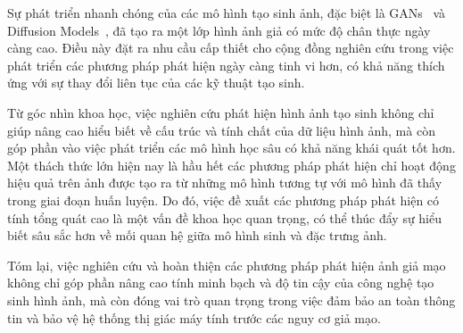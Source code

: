 Sự phát triển nhanh chóng của các mô hình tạo sinh ảnh, đặc biệt là GANs~\cite{Goodfellow2014GenerativeAN} và Diffusion Models~\cite{Ho2020DenoisingDP}, đã tạo ra một lớp hình ảnh giả có mức độ chân thực ngày càng cao. Điều này đặt ra nhu cầu cấp thiết cho cộng đồng nghiên cứu trong việc phát triển các phương pháp phát hiện ngày càng tinh vi hơn, có khả năng thích ứng với sự thay đổi liên tục của các kỹ thuật tạo sinh.
%

Từ góc nhìn khoa học, việc nghiên cứu phát hiện hình ảnh tạo sinh không chỉ giúp nâng cao hiểu biết về cấu trúc và tính chất của dữ liệu hình ảnh, mà còn góp phần vào việc phát triển các mô hình học sâu có khả năng khái quát tốt hơn. Một thách thức lớn hiện nay là hầu hết các phương pháp phát hiện chỉ hoạt động hiệu quả trên ảnh được tạo ra từ những mô hình tương tự với mô hình đã thấy trong giai đoạn huấn luyện. Do đó, việc đề xuất các phương pháp phát hiện có tính tổng quát cao là một vấn đề khoa học quan trọng, có thể thúc đẩy sự hiểu biết sâu sắc hơn về mối quan hệ giữa mô hình sinh và đặc trưng ảnh.
%


Tóm lại, việc nghiên cứu và hoàn thiện các phương pháp phát hiện ảnh giả mạo không chỉ góp phần nâng cao tính minh bạch và độ tin cậy của công nghệ tạo sinh hình ảnh, mà còn đóng vai trò quan trọng trong việc đảm bảo an toàn thông tin và bảo vệ hệ thống thị giác máy tính trước các nguy cơ giả mạo.

